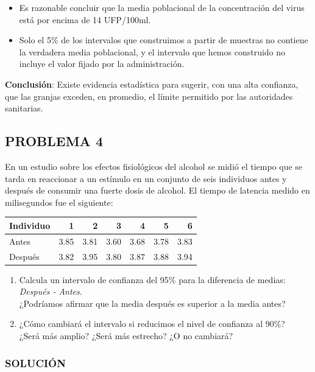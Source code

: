 \documentclass[
]{article}
\providecommand{\tightlist}{%
  \setlength{\itemsep}{0pt}\setlength{\parskip}{0pt}}
\begin{document}
\begin{itemize}
\tightlist
\item
  Es razonable concluir que la media poblacional de la concentración del virus está por encima de 14 UFP/100ml.
\item
  Solo el 5\% de los intervalos que construimos a partir de muestras no contiene la verdadera media poblacional, y el intervalo que hemos construido no incluye el valor fijado por la administración.
\end{itemize}

\textbf{Conclusión}: Existe evidencia estadística para sugerir, con una alta confianza, que las granjas exceden, en promedio, el límite permitido por las autoridades sanitarias.

\subsection{PROBLEMA 4}\label{problema-4-1}

En un estudio sobre los efectos fisiológicos del alcohol se midió el tiempo que se tarda en reaccionar a un estímulo en un conjunto de seis individuos antes y después de consumir una fuerte dosis de alcohol. El tiempo de latencia medido en milisegundos fue el siguiente:

\begin{longtable}[]{@{}lrrrrrr@{}}
\toprule\noalign{}
Individuo & 1 & 2 & 3 & 4 & 5 & 6 \\
\midrule\noalign{}
\endhead
\bottomrule\noalign{}
\endlastfoot
Antes & 3.85 & 3.81 & 3.60 & 3.68 & 3.78 & 3.83 \\
Después & 3.82 & 3.95 & 3.80 & 3.87 & 3.88 & 3.94 \\
\end{longtable}

\begin{enumerate}
\def\labelenumi{\alph{enumi})}
\item
  Calcula un intervalo de confianza del 95\% para la diferencia de medias: \emph{Después - Antes}.\\
  ¿Podríamos afirmar que la media después es superior a la media antes?
\item
  ¿Cómo cambiará el intervalo si reducimos el nivel de confianza al 90\%?\\
  ¿Será más amplio? ¿Será más estrecho? ¿O no cambiará?
\end{enumerate}

\subsubsection{SOLUCIÓN}\label{soluciuxf3n-18}
\end{document}
